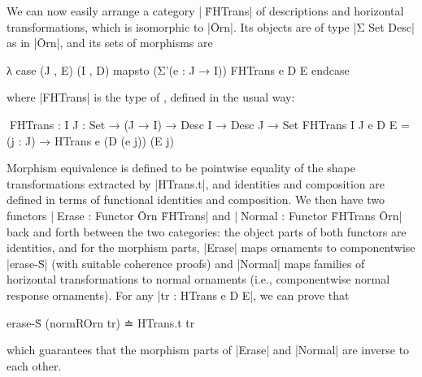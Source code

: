 We can now easily arrange a category |^^^ḞHTrans| of descriptions and horizontal transformations, which is isomorphic to |Ōrn|.
Its objects are of type |Σ Set Desc| as in |Ōrn|, and its sets of morphisms are
\begin{code}
λ case (J , E) (I , D) mapsto (Σ'(e : J → I)) FHTrans e D E endcase
\end{code}
where |FHTrans| is the type of , defined in the usual way:
\begin{code}
^^^FHTrans : {I J : Set} → (J → I) → Desc I → Desc J → Set
FHTrans {I} {J} e D E = (j : J) → HTrans e (D (e j)) (E j)
\end{code}
Morphism equivalence is defined to be pointwise equality of the shape transformations extracted by |HTrans.t|, and identities and composition are defined in terms of functional identities and composition.
We then have two functors |^^^Erase : Functor Ōrn ḞHTrans| and |^^^Normal : Functor ḞHTrans Ōrn| back and forth between the two categories: the object parts of both functors are identities, and for the morphism parts, |Erase| maps ornaments to componentwise |erase-Ṡ| (with suitable coherence proofs) and |Normal| maps families of horizontal transformations to normal ornaments (i.e., componentwise normal response ornaments).
For any |tr : HTrans e D E|, we can prove that
\begin{code}
erase-Ṡ (normROrn tr) ≐ HTrans.t tr
\end{code}
which guarantees that the morphism parts of |Erase| and |Normal| are inverse to each other.

